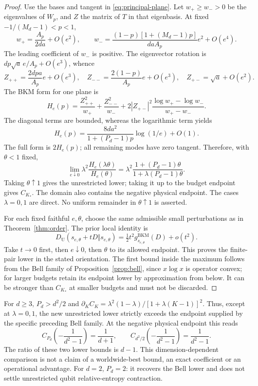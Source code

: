 \begin{proof}
Use the bases and tangent in \eqref{eq:principal-plane}. Let \(w_+\ge w_->0\) be the eigenvalues of \(W_p\), and \(Z\) the matrix of \(T\) in that eigenbasis. At fixed \(-1/(M_d-1)<p<1\),
\[
 w_+=\frac{A_p}{2da}+O(e^2),\qquad
 w_-=\frac{(1-p)[1+(M_d-1)p]}{daA_p}e^2+O(e^4).
\]
The leading coefficient of \(w_-\) is positive. The eigenvector rotation is \(dp\sqrt a\,e/A_p+O(e^3)\), whence
\[
 Z_{++}=\frac{2dpa}{A_p}e+O(e^3),\quad
 Z_{--}=\frac{2(1-p)}{A_p}e+O(e^3),\quad
 Z_{+-}=\sqrt a+O(e^2).
\]
The BKM form for one plane is
\[
 H_e(p)=\frac{Z_{++}^2}{w_+}+\frac{Z_{--}^2}{w_-}
  +2|Z_{+-}|^2\frac{\log w_+-\log w_-}{w_+-w_-}.
\]
The diagonal terms are bounded, whereas the logarithmic term yields
\begin{equation}\label{eq:bkm-log}
 H_e(p)=\frac{8da^2}{1+(P_d-1)p}\log(1/e)+O(1).
\end{equation}
The full form is \(2H_e(p)\); all remaining modes have zero tangent. Therefore, with \(\theta<1\) fixed,
\[
 \lim_{e\downarrow0}\lambda^2\frac{H_e(\lambda\theta)}{H_e(\theta)}
 =\lambda^2\frac{1+(P_d-1)\theta}{1+\lambda(P_d-1)\theta}.
\]
Taking \(\theta\uparrow1\) gives the unrestricted lower; taking it up to the budget endpoint gives \(C_{K_*}\). The domain also contains the negative physical endpoint. The cases \(\lambda=0,1\) are direct. No uniform remainder in \(\theta\uparrow1\) is asserted.

For each fixed faithful \(e,\theta\), choose the same admissible small perturbations as in Theorem~\ref{thm:order}. The prior local identity is
\[
 D_{\mathrm U}(s_{e,\theta}+tD\Vert s_{e,\theta})
 =\tfrac12t^2g^{\mathrm{BKM}}_{s_{e,\theta}}(D)+o(t^2).
\]
Take \(t\to0\) first, then \(e\downarrow0\), then \(\theta\) to its allowed endpoint. This proves the finite-pair lower in the stated orientation. The first bound inside the maximum follows from the Bell family of Proposition~\ref{prop:bell}, since \(x\log x\) is operator convex; for larger budgets retain its endpoint lower by approximation from below. It can be stronger than \(C_{K_*}\) at smaller budgets and must not be discarded.
\end{proof}

For \(d\ge3\), \(P_d>d^2/2\) and
\(\partial_KC_K=\lambda^2(1-\lambda)/[1+\lambda(K-1)]^2\).
Thus, except at \(\lambda=0,1\), the new unrestricted lower strictly exceeds the endpoint supplied by the specific preceding Bell family. At the negative physical endpoint this reads
\[
 C_{P_d}\!\left(-\frac1{d^2-1}\right)=\frac1{d+1},\qquad
 C_{d^2/2}\!\left(-\frac1{d^2-1}\right)=\frac1{d^2-1}.
\]
The ratio of these two lower bounds is \(d-1\). This dimension-dependent comparison is not a claim of a worldwide-best bound, an exact coefficient or an operational advantage. For \(d=2\), \(P_d=2\): it recovers the Bell lower and does not settle unrestricted qubit relative-entropy contraction.

